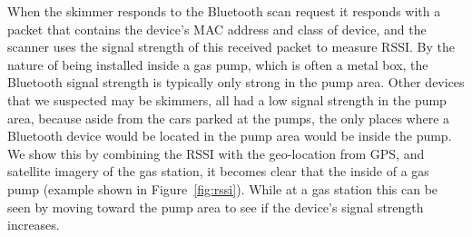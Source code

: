 When the skimmer responds to the Bluetooth scan request it responds with a
packet that contains the device's MAC address and class of device, and the
scanner uses the signal strength of this received packet to measure RSSI.
%
By the nature of being installed inside a gas pump, which is often a metal box,
the Bluetooth signal strength is typically only strong in the pump area.
%
Other devices that we suspected may be skimmers, all had a low signal strength
in the pump area, because aside from the cars parked at the pumps, the only
places where a Bluetooth device would be located in the pump area would be
inside the pump.
%
We show this by combining the RSSI with the geo-location from GPS, and satellite
imagery of the gas station, it becomes clear that the inside of a gas pump
(example shown in Figure~\ref{fig:rssi}).
%
While at a gas station this can be seen by moving toward the pump area to see
if the device's signal strength increases. 



\fi %
